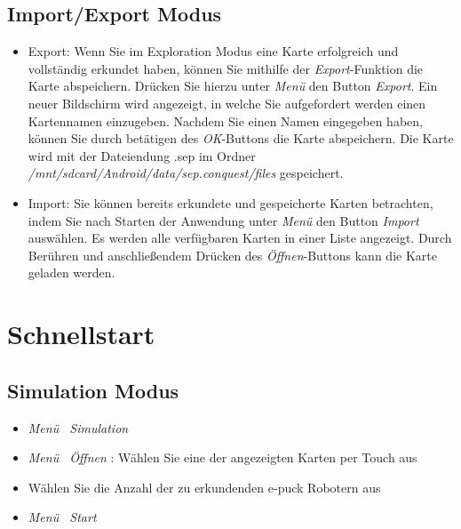 \documentclass[10pt,a4paper]{article}
\let\oldsection\section
\renewcommand{\section}{\newpage \oldsection}
\begin{document}
	\subsection{Import/Export Modus}
		\begin{itemize}
			\item{Export:	Wenn Sie im Exploration Modus eine Karte erfolgreich und vollst\"andig erkundet haben, k\"onnen Sie mithilfe der  \textit{Export}-Funktion die 
			Karte abspeichern.	Dr\"ucken Sie hierzu unter  \textit{Men\"u} den Button  \textit{Export}. Ein neuer Bildschirm wird angezeigt, in welche Sie aufgefordert 
			werden einen Kartennamen	einzugeben. Nachdem Sie einen Namen eingegeben haben, k\"onnen Sie durch bet\"atigen des  \textit{OK}-Buttons die Karte 
			abspeichern. Die Karte  wird mit der Dateiendung .sep im Ordner \textit{/mnt/sdcard/Android/data/sep.conquest/files} gespeichert.}
			\item{Import: Sie k\"onnen bereits erkundete und gespeicherte Karten betrachten, indem Sie nach Starten der Anwendung unter \textit{Men\"u} den Button 
				\textit{Import} ausw\"ahlen. Es werden alle verf\"ugbaren Karten in einer Liste angezeigt. Durch Ber\"uhren und anschlie\ss endem Dr\"ucken des 										\textit{\"Offnen}-Buttons kann die Karte geladen werden.}
		\end{itemize}
\section{Schnellstart}
	\subsection{Simulation Modus}
		\begin{itemize}
			\item{\textit{Men\"u \frq \frq \ Simulation}}
			\item{\textit{Men\"u \frq \frq \ \"Offnen} : W\"ahlen Sie eine der angezeigten Karten per Touch aus}
			\item{W\"ahlen Sie die Anzahl der zu erkundenden e-puck Robotern aus}
			\item{\textit{Men\"u \frq \frq \ Start}}									
		\end{itemize}
\end{document}
